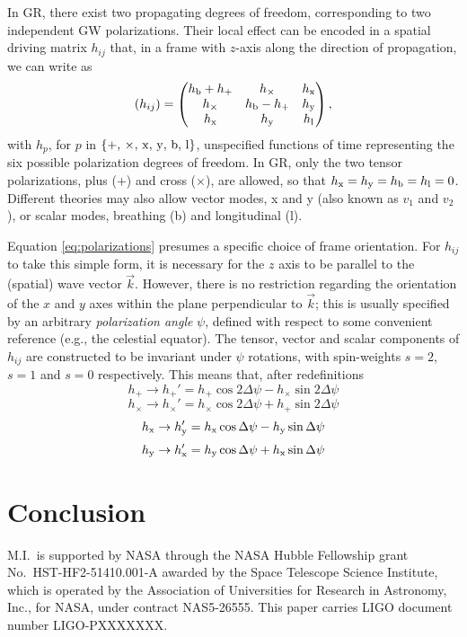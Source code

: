 \documentclass[aps,prd,twocolumn,superscriptaddress,preprintnumbers,floatfix,nofootinbib]{revtex4-2}
\newcommand{\beq}{\begin{equation}}
\newcommand{\eeq}{\end{equation}}
\newcommand{\dcc}{LIGO-PXXXXXXX}
\begin{document}
In GR, there exist two propagating degrees of freedom, corresponding to two independent GW polarizations.
Their local effect can be encoded in a spatial driving matrix $h_{ij}$ that, in a frame with $z$-axis along the direction of propagation, we can write as
\beq \label{eq:polarizations}
(h_{ij}) = \begin{pmatrix}
\hb + h_+ & h_\times  & \hx  \\
h_\times  & \hb - h_+ & \hy  \\
\hx    & \hy    & \hlon
\end{pmatrix} ,
\eeq
with $h_p$, for $p$ in $\{+,\, \times,\, {\rm x},\, {\rm y},\, {\rm b},\, {\rm l}\}$, unspecified functions of time representing the six possible polarization degrees of freedom.
In GR, only the two tensor polarizations, plus ($+$) and cross ($\times$), are allowed, so that $h_{\rm x}=h_{\rm y}=h_{\rm b}=h_{\rm l}=0$.
Different theories may also allow vector modes, x and y (also known as $v_1$ and $v_2$), or scalar modes, breathing (b) and longitudinal (l).

Equation \eqref{eq:polarizations} presumes a specific choice of frame orientation.
For $h_{ij}$ to take this simple form, it is necessary for the $z$ axis to be parallel to the (spatial) wave vector $\vec{k}$.
However, there is no restriction regarding the orientation of the $x$ and $y$ axes within the plane perpendicular to $\vec{k}$; this is usually specified by an arbitrary \emph{polarization angle} $\psi$, defined with respect to some convenient reference (e.g., the celestial equator).
The tensor, vector and scalar components of $h_{ij}$ are constructed to be invariant under $\psi$ rotations, with spin-weights $s=2$, $s=1$ and $s=0$ respectively.
This means that, after redefinitions
\beq
h_+ \rightarrow h_+' = h_+ \cos 2\Delta \psi - h_\times \sin 2\Delta\psi 
\eeq
\beq
h_\times \rightarrow h_\times' = h_\times \cos 2\Delta \psi + h_+ \sin 2\Delta\psi 
\eeq
\beq
\hx \rightarrow \hy' = \hx \cos \Delta \psi - \hy \sin \Delta\psi 
\eeq
\beq
\hy \rightarrow \hx' = \hy \cos \Delta \psi + \hx \sin \Delta\psi 
\eeq

\section{Conclusion}

\begin{acknowledgments}
M.I.\ is supported by NASA through the NASA Hubble Fellowship
grant No.\ HST-HF2-51410.001-A awarded by the Space Telescope
Science Institute, which is operated by the Association of Universities
for Research in Astronomy, Inc., for NASA, under contract NAS5-26555.
This paper carries LIGO document number \dcc{}.
\end{acknowledgments}


\end{document}
